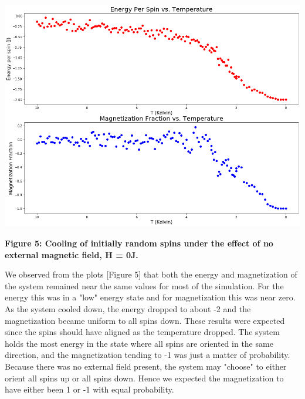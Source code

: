 \documentclass[11pt]{article}
\begin{document}
\begin{center}
    \includegraphics[width = \linewidth]{randomNoField.png}
    \caption{\textbf{Figure 5: Cooling of initially random spins under the effect of no external magnetic field, H = 0J.}}
    \label{fig:plt1}
\end{center}

We observed from the plots [Figure 5] that both the energy and magnetization of the system remained near the same values for most of the simulation. For the energy this was in a "low" energy state and for magnetization this was near zero. As the system cooled down, the energy dropped to about -2 and the magnetization became uniform to all spins down. These results were expected since the spins should have aligned as the temperature dropped. The system holds the most energy in the state where all spins are oriented in the same direction, and the magnetization tending to -1 was just a matter of probability. Because there was no external field present, the system may "choose" to either orient all spins up or all spins down. Hence we expected the magnetization to have either been 1 or -1 with equal probability.
\end{document}
